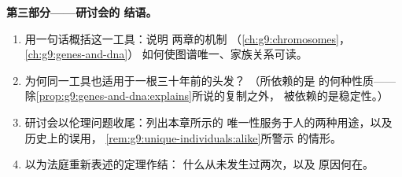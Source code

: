 \begin{problem}
\medskip\noindent\textbf{第三部分——研讨会的
结语。}
\begin{enumerate}[resume]
  \item 用一句话概括这一工具：说明
        两章的机制
        （\cref{ch:g9:chromosomes}，
        \cref{ch:g9:genes-and-dna}）
        如何使图谱唯一、家族关系可读。
  \item 为何同一工具也适用于一根三十年前的头发？
        （所依赖的是  的何种性质——
        除\cref{prop:g9:genes-and-dna:explains}所说的复制之外，
        被依赖的是稳定性。）
  \item 研讨会以伦理问题收尾：列出本章所示的
        唯一性服务于人的两种用途，以及
        历史上的误用，
        \cref{rem:g9:unique-individuals:alike}所警示
        的情形。
  \item 以为法庭重新表述的定理作结：
        什么从未发生过两次，以及
        原因何在。
\end{enumerate}
\end{problem}
